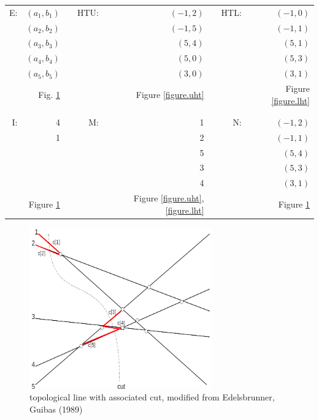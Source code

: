 \documentclass[12pt]{article}
\begin{document}
        \begin{tabular}{rrcrrcrr}
            E:  & $(a_1, b_1)$ &    & HTU:  & $(-1, 2)$ &  & HTL: & $(-1, 0)$ \\ 
                & $(a_2, b_2)$ &    &       & $(-1, 5)$ & &       & $(-1, 1)$\\
                & $(a_3, b_3)$ &    &       & $(5,  4)$ & &       & $(5,  1)$\\
                & $(a_4, b_4)$ &    &       & $(5,  0)$ & &       & $(5,  3)$\\
                & $(a_5, b_5)$ &    &       & $(3,  0)$ & &       & $(3,  1)$\\
                & Fig. \ref{figure.linecut} & & & Figure \ref{figure.uht} & & & Figure \ref{figure.lht} \\
            & & & & & & & \\
            \hline
            & & & & & & & \\
            I:  & 4            &    & M:    & 1         &  & N:   & $(-1, 2)$\\
                & 1            &    &       & 2         &  &      & $(-1, 1)$\\
                &              &    &       & 5         &  &      & $(5,  4)$\\
                &              &    &       & 3         &  &      & $(5,  3)$\\
                &              &    &       & 4         &  &      & $(3,  1)$ \\
                & Figure \ref{figure.linecut} & & & Figure \ref{figure.uht}, \ref{figure.lht} & & & Figure \ref{figure.linecut}
        \end{tabular}

        

        
        \begin{figure}
            \center
            \includegraphics[width=0.7\textwidth]{linecut.png}
            \caption{topological line with associated cut, modified from Edelsbrunner, Guibas (1989)}
            \label{figure.linecut} 
        \end{figure}
\end{document}
